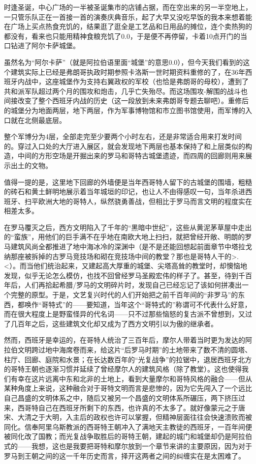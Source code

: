\documentclass[
]{book}
\begin{document}
时逢圣诞，中心广场的一半被圣诞集市的店铺占据，而在空出来的另一半空地上，一只管乐队正在一首接一首的演奏庆典音乐，起了大早又没吃早饭的我本来想着能在广场上买点热食充饥的，结果逛了逛全是工艺品和日用品的摊位，连个卖热狗的都没有，看来也只能用精神食粮充饥了0.0，于是便不再停留，卡着10点开门的当口钻进了阿尔卡萨城堡。

虽然名为``阿尔卡萨''（就是阿拉伯语里面``城堡''的意思0.0），但今天我们看到的这个建筑实际上已经是弗朗哥执政时期参照卡洛斯一世时期资料重修的了，在36年西班牙内战中，这座城堡作为支持右翼政权的军校（也恰是弗朗哥的母校），遭到了共和派军队超过两个月的围攻和炮击，几乎亡失殆尽。而这场围攻-解围的战斗也间接改变了整个西班牙内战的历史（这一段放到未来弗朗哥专题去聊吧）。重修后的城堡分为地面两层，地下两层，作为军事博物馆和市立图书馆使用，而军博的入口就在北侧最底层。

整个军博分为4层，全部走完至少要两个小时左右，还是非常适合用来打发时间的。穿过入口处的大厅进入展区，就会发现地下两层也基本保持了和上层类似的构造，中间的方形空场是开掘出来的罗马和哥特古城堡遗迹，而四周的回廊则用来展示出土的文物。

值得一提的是，这里地下回廊的外墙便是当年西哥特人留下的古城堡的围墙，粗糙的砖石和黄土鲜明地展示着当年城垣的印记，也让人不由得感叹一句，当年杀进西班牙、扫平欧洲大地的哥特人，纵然骁勇善战，但相比于罗马而言文明的程度实在相差太多。

在罗马覆灭之后，西方文明陷入了千年的``黑暗中世纪''，这些从黄泥茅草屋中走出的``蛮族''，用他们的巨手满不在乎地在南欧大地上扫扫，就把曾经开敞、明朗的罗马建筑风尚全都推进了地中海冰冷的深渊中（是不是还能回想起前面章节中塔拉戈纳那座被拆掉的古罗马竞技场和砌在竞技场中间的教堂？那也是哥特人干的\textgreater.\textless）。而当他们统治起来，又建起高大厚重的城堡、尖塔高耸的教堂时，却懊恼地发现，似乎无论怎么模仿，也找不回曾经罗马圣殿宏伟的样子了。甚至，待到千百年后，人们再拾起希腊/罗马的文明碎片时，发现自己已经忘记了该如何拼凑出一个完整的原型。于是，文艺复兴时代的人们开始把之前千百年间的``非罗马''的东西，都唤作``哥特式''的------要知道，当年这个``哥特式的''称谓可不代表什么好意，而在很大程度上是野蛮怪异的代名词------只不过那些恼怒的复古派不曾想到，又过了几百年之后，这些建筑文化却又成为了西方文明引以为傲的继承者。

然而，西班牙是幸运的，在哥特人统治了三百年后，摩尔人带着当时更为发达的阿拉伯文明跨过地中海席卷而来，给这片``后罗马时期''的土地带来了数不清的圆塔、柱厅、回廊、庭院和水景；在长达数百年的``光复战争''的拉锯中，退居西班牙北方的哥特王朝也逐渐习惯并延续了曾经摩尔人的建筑风格（除了教堂）。这也使得我们有幸在这片远离中东和北非的土地上，看到大量摩尔和哥特风格的融合------但从某种角度上来说，这种融合对于哥特文明而言是悲惨的，因为它先闯入了一个远比自己昌盛的文明体系之中，随后又被另一个昌盛的文明体系所碾压，两下挤压过来，西哥特自己在西班牙所剩下的东西，也许真的不太多了。就好像蒙元之于唐宋、大清之于大明，入主后的政权也许可以掌握，但精神层面往往会快速溃败而被同化。信奉阿里乌斯教派的西哥特王朝冲入了满地天主教徒的西班牙，一百年间便被同化改了国教；而光复战争取胜后的哥特王朝，建起的城门和城堡却仍是阿拉伯式的------我想，这也是我要把哥特和摩尔放到一个章节来讲的主要原因，因为对于罗马到王朝之间的这一千年历史而言，择开这两者之间的纠缠实在是太困难了。
\end{document}
